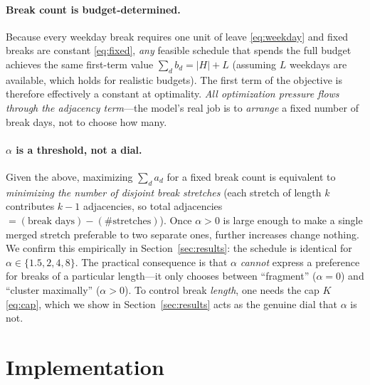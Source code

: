 \documentclass[10pt,twocolumn]{article}
\begin{document}
\paragraph{Break count is budget-determined.}
Because every weekday break requires one unit of leave \eqref{eq:weekday} and
fixed breaks are constant \eqref{eq:fixed}, \emph{any} feasible schedule that
spends the full budget achieves the same first-term value
$\sum_d b_d = |H| + L$ (assuming $L$ weekdays are available, which holds for
realistic budgets). The first term of the objective is therefore effectively a
constant at optimality. \emph{All optimization pressure flows through the
adjacency term}---the model's real job is to \emph{arrange} a fixed number of
break days, not to choose how many.

\paragraph{$\alpha$ is a threshold, not a dial.}
Given the above, maximizing $\sum_d a_d$ for a fixed break count is equivalent
to \emph{minimizing the number of disjoint break stretches} (each stretch of
length $k$ contributes $k-1$ adjacencies, so total adjacencies
$= (\text{break days}) - (\text{\# stretches})$). Once $\alpha > 0$ is large
enough to make a single merged stretch preferable to two separate ones, further
increases change nothing. We confirm this empirically in
Section~\ref{sec:results}: the schedule is identical for
$\alpha \in \{1.5, 2, 4, 8\}$. The practical consequence is that $\alpha$
\emph{cannot} express a preference for breaks of a particular length---it only
chooses between ``fragment'' ($\alpha=0$) and ``cluster maximally''
($\alpha>0$). To control break \emph{length}, one needs the cap $K$
\eqref{eq:cap}, which we show in Section~\ref{sec:results} acts as the genuine
dial that $\alpha$ is not.

\section{Implementation}
\label{sec:impl}
\end{document}
